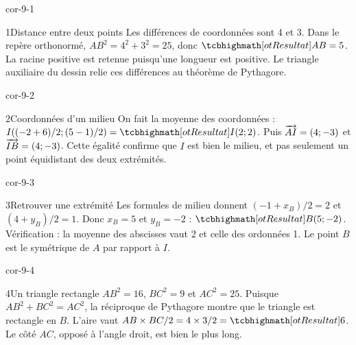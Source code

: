 \clearpage\pagestyle{otMain}\fontsize{11}{15}\selectfont
{}
\begin{blocLivre}{cor-9-1}
\begin{corrige}{1}{Distance entre deux points}
Les différences de coordonnées sont 4 et 3. Dans le repère orthonormé, $AB^2=4^2+3^2=25$, donc $\res{AB=5}$. La racine positive est retenue puisqu’une longueur est positive. Le triangle auxiliaire du dessin relie ces différences au théorème de Pythagore.
\label{fig-cor-9-1}
\end{corrige}
\end{blocLivre}
\begin{blocLivre}{cor-9-2}
\begin{corrige}{2}{Coordonnées d’un milieu}
On fait la moyenne des coordonnées : $I((-2+6)/2;(5-1)/2)=\res{I(2;2)}$. Puis $\overrightarrow{AI}=(4;-3)$ et $\overrightarrow{IB}=(4;-3)$. Cette égalité confirme que $I$ est bien le milieu, et pas seulement un point équidistant des deux extrémités.
\label{fig-cor-9-2}
\end{corrige}
\end{blocLivre}
\begin{blocLivre}{cor-9-3}
\begin{corrige}{3}{Retrouver une extrémité}
Les formules de milieu donnent $(-1+x_B)/2=2$ et $(4+y_B)/2=1$. Donc $x_B=5$ et $y_B=-2$ : $\res{B(5;-2)}$. Vérification : la moyenne des abscisses vaut 2 et celle des ordonnées 1. Le point $B$ est le symétrique de $A$ par rapport à $I$.
\label{fig-cor-9-3}
\end{corrige}
\end{blocLivre}
\begin{blocLivre}{cor-9-4}
\begin{corrige}{4}{Un triangle rectangle}
$AB^2=16$, $BC^2=9$ et $AC^2=25$. Puisque $AB^2+BC^2=AC^2$, la réciproque de Pythagore montre que le triangle est rectangle en $B$. L’aire vaut $AB\times BC/2=4\times3/2=\res6$. Le côté $AC$, opposé à l’angle droit, est bien le plus long.
\label{fig-cor-9-4}
\end{corrige}
\end{blocLivre}
